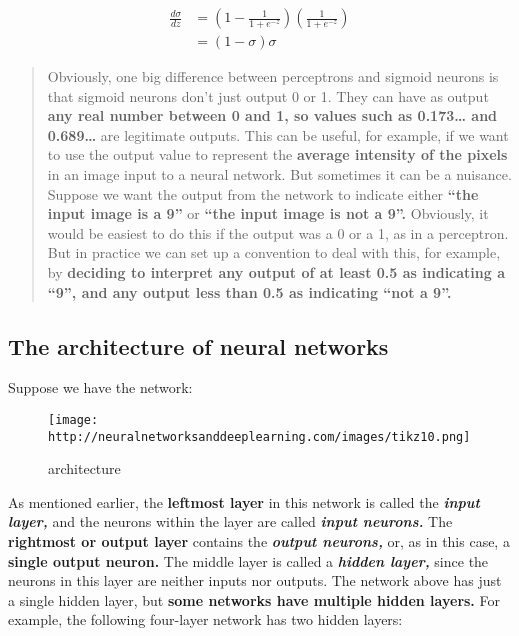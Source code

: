 \documentclass[]{article}
\begin{document}
\begin{equation}
    \begin{split}       
        \frac{d\sigma}{dz} &= \left({1 - \frac{1}{1 + e ^ {-z}}}\right)
        \left(\frac{1}{1 + e ^ {-z}}\right)\\
        &=(1 - \sigma)\sigma
\end{split}
\end{equation}

\begin{quote}
Obviously, one big difference between perceptrons and sigmoid neurons is
that sigmoid neurons don't just output 0 or 1. They can have as output
\textbf{any real number between 0 and 1, so values such as 0.173\ldots{}
and 0.689\ldots{}} are legitimate outputs. This can be useful, for
example, if we want to use the output value to represent the
\textbf{average intensity of the pixels} in an image input to a neural
network. But sometimes it can be a nuisance. Suppose we want the output
from the network to indicate either \textbf{``the input image is a 9''}
or \textbf{``the input image is not a 9''.} Obviously, it would be
easiest to do this if the output was a 0 or a 1, as in a perceptron. But
in practice we can set up a convention to deal with this, for example,
by \textbf{deciding to interpret any output of at least 0.5 as
indicating a ``9'', and any output less than 0.5 as indicating ``not a
9''.}
\end{quote}

\subsection{The architecture of neural
networks}\label{the-architecture-of-neural-networks}

Suppose we have the network:

\begin{figure}[htbp]
\centering
\texttt{[image: http://neuralnetworksanddeeplearning.com/images/tikz10.png]}
\caption{architecture}
\end{figure}

As mentioned earlier, the \textbf{leftmost layer} in this network is
called the \textbf{\emph{input layer,}} and the neurons within the layer
are called \textbf{\emph{input neurons.}} The \textbf{rightmost or
output layer} contains the \textbf{\emph{output neurons,}} or, as in
this case, a \textbf{single output neuron.} The middle layer is called a
\textbf{\emph{hidden layer,}} since the neurons in this layer are
neither inputs nor outputs. The network above has just a single hidden
layer, but \textbf{some networks have multiple hidden layers.} For
example, the following four-layer network has two hidden layers:
\end{document}
